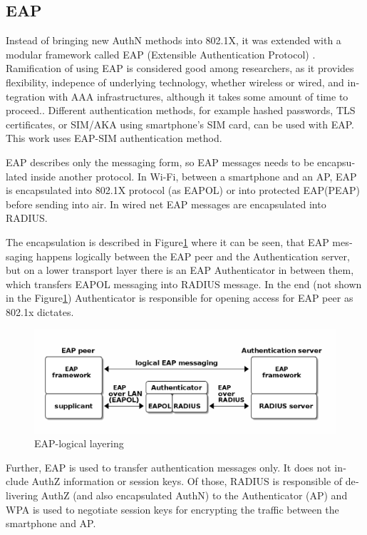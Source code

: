 \documentclass[12pt,a4paper,english]{tutthesis}
\begin{document}
\begin{otherlanguage}{english}
\section{EAP}
\label{sec-2-4}

Instead of bringing new AuthN methods into 802.1X, it was 
extended with a modular framework called 
 EAP (Extensible Authentication Protocol) \cite{rfc5247}. 
Ramification of using EAP is considered good among researchers, as it
provides flexibility, indepence of underlying technology, whether
wireless or wired,  and integration with AAA infrastructures, although
it takes some amount of time to
proceed.\cite{pereniguez10}.
Different authentication methods, for example hashed passwords, TLS
 certificates, or SIM/AKA using smartphone's SIM card,  can
be used with EAP.
This work uses EAP-SIM authentication method.


EAP describes only the messaging form, so EAP messages needs to
be encapsulated inside another protocol.  In Wi-Fi, between a smartphone
and an AP, EAP is encapsulated into 802.1X protocol (as EAPOL) or
into protected EAP(PEAP)\cite{peap} before sending
into air. In wired net EAP messages are encapsulated into RADIUS.

The encapsulation is described in Figure\ref{fig:eap-layers} where it
can be seen, that EAP messaging happens logically between the EAP peer
and the
Authentication server, but on a lower transport layer there is an EAP
Authenticator in between them, which transfers EAPOL messaging into
RADIUS message.  In the end (not shown in the Figure\ref{fig:eap-layers})
Authenticator is responsible for opening access for EAP peer as 802.1x dictates.




\begin{figure}[htb]
\centering
\includegraphics[width=.9\linewidth]{eap-layer.png}
\caption{\label{fig:eap-layers}EAP-logical layering}
\end{figure}


Further, EAP is used to transfer authentication
messages only.
It does not include AuthZ information or session keys.
Of those, RADIUS is responsible of delivering AuthZ (and also
encapsulated AuthN) to the Authenticator (AP)
and WPA is used to negotiate session keys for encrypting the traffic
between the smartphone and AP.



\end{otherlanguage}
\end{document}
